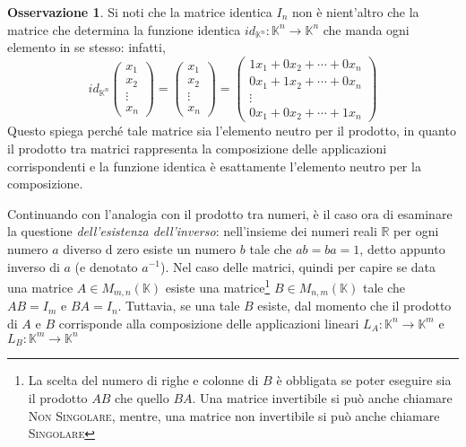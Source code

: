 \documentclass{book}
\theoremstyle{definition}
\newtheorem{oss}{Osservazione}[section]
\theoremstyle{plain}
\begin{document}
\begin{oss}
  \label{oss:Compinveeproddimatrici4}
  Si noti che la matrice identica $I_n$ non è nient'altro che la matrice che determina la funzione identica
  $id_{\mathds{K}^n}:\mathds{K}^n\to\mathds{K}^n$ che manda ogni elemento in se stesso: infatti,
  \begin{equation}
    \label{eq:Compinveeproddimatrici7}
    id_{\mathds{K}^n}
    \begin{pmatrix}
      x_1\\
      x_2\\
      \vdots\\
      x_n
    \end{pmatrix}=
    \begin{pmatrix}
      x_1\\
      x_2\\
      \vdots\\
      x_n 
    \end{pmatrix}=
    \begin{pmatrix}
      1x_1+0x_2+\cdots+0x_n\\
      0x_1+1x_2+\cdots+0x_n\\
      \vdots\\
      0x_1+0x_2+\cdots+1x_n
    \end{pmatrix}
  \end{equation}
  Questo spiega perché tale matrice sia l'elemento neutro per il prodotto, in quanto il prodotto tra matrici
  rappresenta la composizione delle applicazioni corrispondenti e la funzione identica è esattamente
  l'elemento neutro per la composizione.
\end{oss}
Continuando con l'analogia con il prodotto tra numeri, è il caso ora di esaminare la questione
\textit{dell'esistenza dell'inverso}: nell'insieme dei numeri reali $\mathds{R}$ per ogni numero $a$ diverso
d zero esiste un numero $b$ tale che $ab=ba=1$, detto appunto inverso di $a$ (e denotato $a^{-1}$).
Nel caso delle matrici, quindi per capire se data una matrice $A\in M_{m,n}(\mathds{K})$ esiste una
matrice\footnote{La scelta del numero di righe e colonne di $B$ è obbligata se poter eseguire sia il
  prodotto $AB$ che quello $BA$. Una matrice invertibile si può anche chiamare \textsc{Non Singolare}, mentre,
  una matrice non invertibile si può anche chiamare \textsc{Singolare}} $B\in M_{n,m}(\mathds{K})$ tale che
$AB=I_m$ e $BA=I_n$. Tuttavia, se una tale $B$ esiste, dal momento che il prodotto di $A$ e $B$ corrisponde alla
composizione delle applicazioni lineari $L_A:\mathds{K}^n\to\mathds{K}^m$ e $L_B:\mathds{K}^m\to\mathds{K}^n$
\end{document}
